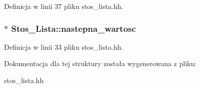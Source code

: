 \-Definicja w linii 37 pliku stos\-\_\-lista.\-hh.

\hypertarget{struct_stos___lista_a2b4b6b290201eda9964dafc81b123065}{
\subsubsection[{nastepna\-\_\-wartosc}]{$\ast$ {\bf \-Stos\-\_\-\-Lista\-::nastepna\-\_\-wartosc}}}\label{struct_stos___lista_a2b4b6b290201eda9964dafc81b123065}


\-Definicja w linii 33 pliku stos\-\_\-lista.\-hh.



\-Dokumentacja dla tej struktury została wygenerowana z pliku\-:\begin{DoxyCompactItemize}
\item 
stos\-\_\-lista.\-hh\end{DoxyCompactItemize}
